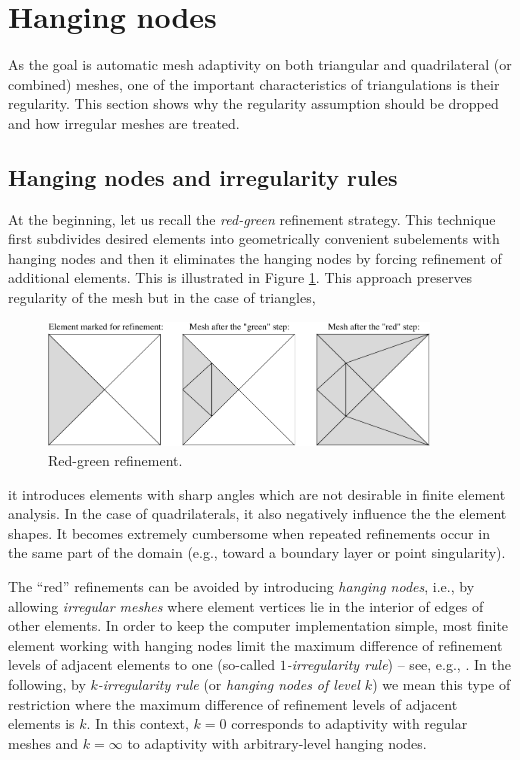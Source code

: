 \section{Hanging nodes}
As the goal is automatic
mesh adaptivity on both triangular and quadrilateral (or combined) meshes, one of the important characteristics of triangulations is their regularity. This section shows why the regularity assumption should be dropped and how irregular meshes are treated.

\subsection{Hanging nodes and irregularity rules} 
\label{sec:hang}

At the beginning, let us recall the {\em red-green} refinement
strategy. This technique first subdivides desired elements
into geometrically convenient subelements with
hanging nodes and then it eliminates the
hanging nodes by forcing refinement of additional
elements. This is illustrated in Figure \ref{fig:redgreen}.
This approach preserves regularity of the mesh but in the case of triangles,
\begin{figure}[hb]
\centering
\vspace{4mm}
\includegraphics[width=0.9\textwidth]{img/redgreen}
\vspace{-2mm}
\caption{Red-green refinement.}
\label{fig:redgreen}
\end{figure}
it introduces elements with sharp angles
which are not desirable in finite element analysis. In the case of quadrilaterals, it also negatively influence the the element shapes.
It becomes extremely cumbersome when
repeated refinements occur  in the same part of the
domain (e.g., toward a boundary layer or point singularity).

The ``red'' refinements can be avoided
by introducing {\em hanging nodes}, i.e., by allowing
{\em irregular meshes} where element vertices lie
in the interior of edges of other elements. In order to keep the
computer implementation simple, most finite element
working with hanging nodes
limit the maximum difference of refinement
levels of adjacent elements to one (so-called
{\em $1$-irregularity rule}) --  see, e.g., \cite{demk5,RaDe2,SoDe}.
In the following, by {\em $k$-irregularity rule} (or {\em hanging nodes of level $k$})
we mean this type of restriction where the maximum
difference of refinement levels of adjacent elements
is $k$. In this context, $k=0$ corresponds to adaptivity with
regular meshes and $k=\infty$ to adaptivity with arbitrary-level
hanging nodes.


